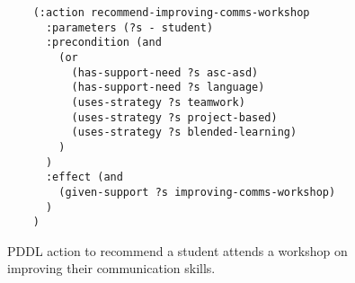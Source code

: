 \begin{figure}[t]
    \begin{lstlisting}
    (:action recommend-improving-comms-workshop
      :parameters (?s - student)
      :precondition (and
        (or
          (has-support-need ?s asc-asd)
          (has-support-need ?s language)
          (uses-strategy ?s teamwork)
          (uses-strategy ?s project-based)
          (uses-strategy ?s blended-learning)
        )
      )
      :effect (and 
        (given-support ?s improving-comms-workshop)
      )
    )
    \end{lstlisting}
    \caption{PDDL action to recommend a student attends a workshop on improving their communication skills.}\label{fig:improve-comms-workshop}
\end{figure}